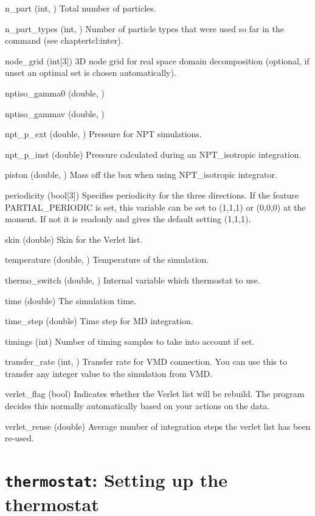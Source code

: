 \begin{globvar}
\item[n_part] (int, \ro) Total number of particles.
\item[n_part_types] (int, \ro) Number of particle types that were
  used so far in the  command (see chapter{tcl:inter}).
\item[node_grid] (int[3]) 3D node grid for real space domain
  decomposition (optional, if unset an optimal set is chosen
  automatically).
\item[nptiso_gamma0] (double, \ro)
\item[nptiso_gammav] (double, \ro)
\item[npt_p_ext] (double, \ro) Pressure for NPT simulations.
\item[npt_p_inst] (double) Pressure calculated during an
  NPT_isotropic integration.
\item[piston] (double, \ro) Mass off the box when using NPT_isotropic
  integrator.
\item[periodicity] (bool[3]) Specifies periodicity for the three
  directions. If the feature PARTIAL_PERIODIC is set, this variable
  can be set to (1,1,1) or (0,0,0) at the moment.  If not it is
  readonly and gives the default setting (1,1,1).
\item[skin] (double) Skin for the Verlet list.
\item [temperature] (double, \ro) Temperature of the
  simulation.
\item[thermo_switch] (double, \ro) Internal variable which thermostat
  to use. 
\item[time] (double) The simulation time.
\item[time_step] (double) Time step for MD integration.
\item[timings] (int) Number of timing samples to take into account if
  set.
\item[transfer_rate] (int, \ro) Transfer rate for VMD connection. You
  can use this to transfer any integer value to the simulation from
  VMD.
\item[verlet_flag] (bool) Indicates whether the Verlet list will be
  rebuild. The program decides this normally automatically based on
  your actions on the data.
\item[verlet_reuse] (double) Average number of integration steps the
  verlet list has been re-used.
\end{globvar}

\section{\texttt{thermostat}: Setting up the thermostat}

